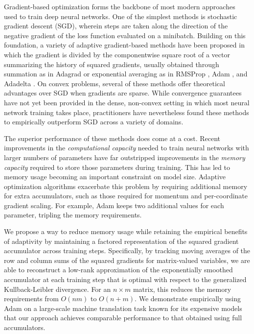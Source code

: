 \documentclass{article}
\begin{document}
Gradient-based optimization forms the backbone of most modern approaches used to train deep neural networks. One of the simplest methods is stochastic gradient descent (SGD), wherein steps are taken along the direction of the negative gradient of the loss function evaluated on a minibatch. Building on this foundation, a variety of adaptive gradient-based methods have been proposed in which the gradient is divided by the componentwise square root of a vector summarizing the history of squared gradients, usually obtained through summation as in Adagrad \cite{Duchi11Adaptive} or exponential averaging as in RMSProp \cite{Tieleman12RmsProp}, Adam \cite{Kingma14Adam}, and Adadelta \cite{Zeiler12Adadelta}. On convex problems, several of these methods offer theoretical advantages over SGD when gradients are sparse. While convergence guarantees have not yet been provided in the dense, non-convex setting in which most neural network training takes place, practitioners have nevertheless found these methods to empirically outperform SGD across a variety of domains.

The superior performance of these methods does come at a cost. Recent improvements in the \emph{computational capacity} needed to train neural networks with larger numbers of parameters have far outstripped improvements in the \emph{memory capacity} required to store those parameters during training. This has led to memory usage becoming an important constraint on model size. Adaptive optimization algorithms exacerbate this problem by requiring additional memory for extra accumulators, such as those required for momentum and per-coordinate gradient scaling. For example, Adam \cite{Kingma14Adam} keeps two additional values for each parameter, tripling the memory requirements.

We propose a way to reduce memory usage while retaining the empirical benefits of adaptivity by maintaining a factored representation of the squared gradient accumulator across training steps. Specifically, by tracking moving averages of the row and column sums of the squared gradients for matrix-valued variables, we are able to reconstruct a low-rank approximation of the exponentially smoothed accumulator at each training step that is optimal with respect to the generalized Kullback-Leibler divergence. For an $n \times m$ matrix, this reduces the memory requirements from $O(n m)$ to $O(n + m)$. We demonstrate empirically using Adam on a large-scale machine translation task known for its expensive models that our approach achieves comparable performance to that obtained using full accumulators.
\end{document}
